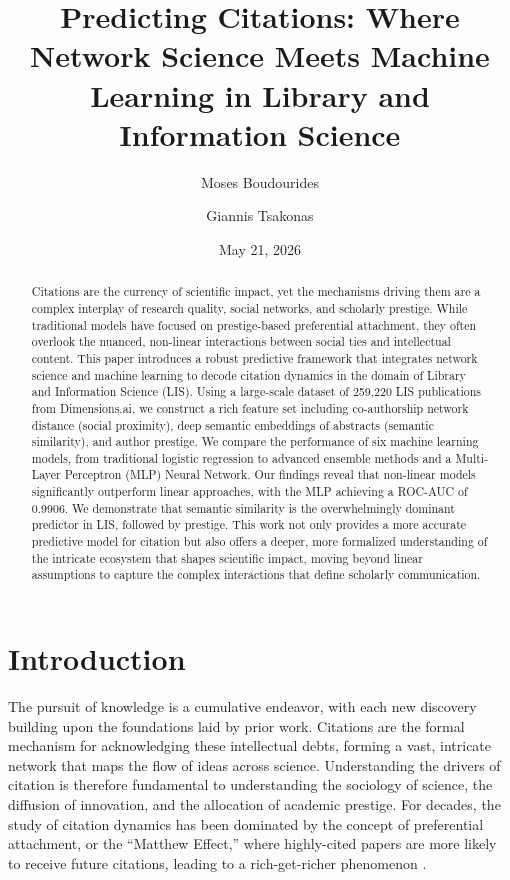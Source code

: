 \documentclass[11pt,a4paper]{article}
\title{Predicting Citations: Where Network Science Meets Machine Learning in Library and Information Science}
\author[1]{Moses Boudourides}
\author[2]{Giannis Tsakonas}
\affil[1]{School of Professional Studies, Northwestern University, Moses.Boudourides@northwestern.edu}
\affil[2]{Library Information Center, University of Patras, GTsak@upatras.gr}
\date{May 21, 2026}
\begin{document}
\maketitle

\begin{abstract}
Citations are the currency of scientific impact, yet the mechanisms driving them are a complex interplay of research quality, social networks, and scholarly prestige. While traditional models have focused on prestige-based preferential attachment, they often overlook the nuanced, non-linear interactions between social ties and intellectual content. This paper introduces a robust predictive framework that integrates network science and machine learning to decode citation dynamics in the domain of Library and Information Science (LIS). Using a large-scale dataset of 259,220 LIS publications from Dimensions.ai, we construct a rich feature set including co-authorship network distance (social proximity), deep semantic embeddings of abstracts (semantic similarity), and author prestige. We compare the performance of six machine learning models, from traditional logistic regression to advanced ensemble methods and a Multi-Layer Perceptron (MLP) Neural Network. Our findings reveal that non-linear models significantly outperform linear approaches, with the MLP achieving a ROC-AUC of 0.9906. We demonstrate that semantic similarity is the overwhelmingly dominant predictor in LIS, followed by prestige. This work not only provides a more accurate predictive model for citation but also offers a deeper, more formalized understanding of the intricate ecosystem that shapes scientific impact, moving beyond linear assumptions to capture the complex interactions that define scholarly communication.
\end{abstract}

\section{Introduction}
The pursuit of knowledge is a cumulative endeavor, with each new discovery building upon the foundations laid by prior work. Citations are the formal mechanism for acknowledging these intellectual debts, forming a vast, intricate network that maps the flow of ideas across science. Understanding the drivers of citation is therefore fundamental to understanding the sociology of science, the diffusion of innovation, and the allocation of academic prestige. For decades, the study of citation dynamics has been dominated by the concept of preferential attachment, or the ``Matthew Effect,'' where highly-cited papers are more likely to receive future citations, leading to a rich-get-richer phenomenon \cite{merton1968, desollaprice1976, barabasi1999}.
\end{document}
